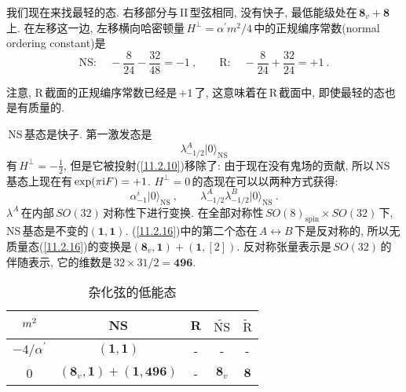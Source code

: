 我们现在来找最轻的态. 右移部分与\,II\,型弦相同, 没有快子, 最低能级处在$\,\mathbf{8}_{v}+\mathbf{8}\,$上. 在左移这一边, 左移横向哈密顿量\,$H^{\bot}=\alpha^{\prime}m^{2}/4\,$中的正规编序常数(normal ordering constant)是
\begin{equation}
    \text{NS}:\quad -\frac{8}{24}-\frac{32}{48} =-1\:, \qquad \text{R}:\quad -\frac{8}{24}+\frac{32}{24}=+1\:.\label{11.2.14} 
\end{equation}
\begin{tcolorbox}
注意, R\,截面的正规编序常数已经是\,$+1$\,了, 这意味着在\,R\,截面中, 即使最轻的态也是有质量的.
\end{tcolorbox}
\,NS\,基态是快子. 第一激发态是
\begin{equation}
    \lambda^{A}_{-1/2}\lvert 0\rangle_{\text{NS}}  \label{11.2.15}
\end{equation}
有\,$H^{\bot}=-\frac{1}{2}$, 但是它被投射(\ref{11.2.10})移除了: 由于现在没有鬼场的贡献, 所以\,NS\,基态上现在有\,$\exp(\pi\mathrm{i} F)=+1$.
$H^{\bot}=0\,$的态现在可以以两种方式获得:
\begin{equation}
\alpha_{-1}^{i}\lvert 0\rangle_{\text{NS}}\:,\qquad \lambda_{-1/2}^{A}\lambda_{-1/2}^{B}\lvert 0\rangle_{\text{NS}} \:. \label{11.2.16}    
\end{equation}
$\lambda^{A}\,$在内部$\,SO(32)\,$对称性下进行变换. 在全部对称性$\,SO(8)_{\text{spin}}\times SO(32)\,$下, NS\,基态是不变的$(\mathbf{1},\mathbf{1})$. (\ref{11.2.16})中的第二个态在$\,A\leftrightarrow B\,$下是反对称的, 所以无质量态(\ref{11.2.16})的变换是$(\mathbf{8}_{v},\mathbf{1})+(\mathbf{1},[2])$. 反对称张量表示是\,$SO(32)\,$的伴随表示, 它的维数是$\,32\times 31/2=\mathbf{496}$. 

\begin{table}[h]
\caption{杂化弦的低能态}
\label{tab:11.2}%
\centering
\begin{tabular}[c]{ccccc}
\hline\hline
 $\vphantom{\Bigl[}m^{2}$ & NS & R & $\widetilde{\text{NS}}$ & $\widetilde{\text{R}}$  \\
\hline
 $-4/\alpha^{\prime}$ & $(\mathbf{1},\mathbf{1})$ & - & - &  -  \\
 0 & $(\mathbf{8}_{v},\mathbf{1})+(\mathbf{1},\mathbf{496})$ & - & $\mathbf{8}_{v}$ & $\mathbf{8}$   \\
 \hline\hline
\end{tabular}
\end{table}


